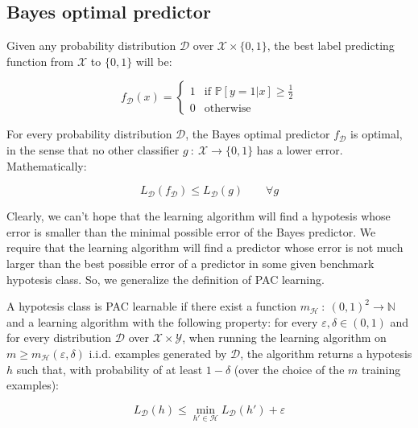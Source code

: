 \documentclass[../../main/main.tex]{subfiles}
\begin{document}
\subsection{Bayes optimal predictor}
Given any probability distribution \( \mathcal{D} \) over \( \mathcal{X} \times \{0,1\} \), the best label predicting function from \( \mathcal{X} \) to \( \{0,1\} \) will be:

\begin{equation}
    f_{\mathcal{D}}(x)
    =
    \begin{cases}
        1   &   \text{if } \mathbb{P}[y=1|x] \ge \frac{1}{2}    \\
        0   &   \text{otherwise}
    \end{cases}
    \label{eq:C2_BOP}
\end{equation}

\begin{proposition}
    For every probability distribution \( \mathcal{D} \), the Bayes optimal predictor \( f_{\mathcal{D}} \) is optimal, in the sense that no other classifier \( g \ : \ \mathcal{X} \to \{0,1\} \) has a lower error. Mathematically:

    \begin{equation}
        L_{\mathcal{D}}(f_{\mathcal{D}}) \le L_{\mathcal{D}}(g)
        \qquad
        \forall g
        \label{eq:C2_BOPB}
    \end{equation}
\end{proposition}

Clearly, we can't hope that the learning algorithm will find a hypotesis whose error is smaller than the minimal possible error of the Bayes predictor. We require that the learning algorithm will find a predictor whose error is not much larger than the best possible error of a predictor in some given benchmark hypotesis class. So, we generalize the definition of PAC learning.

\begin{definition}
    A hypotesis class is PAC learnable if there exist a function \( m_{\mathcal{H}} \ : \ (0,1)^2 \to \mathbb{N} \) and a learning algorithm with the following property:
    for every \( \varepsilon, \delta \in (0,1) \) and
    for every distribution \( \mathcal{D} \) over \( \mathcal{X} \times \mathcal{Y} \),
    when running the learning algorithm on \( m \ge m_{\mathcal{H}}(\varepsilon,\delta) \) i.i.d. examples generated by \( \mathcal{D} \),
    the algorithm returns a hypotesis \( h \) such that, with probability of at least \( 1 - \delta \) (over the choice of the \( m \) training examples):

    \begin{equation}
        L_{\mathcal{D}}(h)
        \le
        \underset{h' \in \mathcal{H}}{\min{}}L_{\mathcal{D}}(h') + \varepsilon
        \label{eq:C2_APL}
    \end{equation}
\end{definition}
\end{document}
